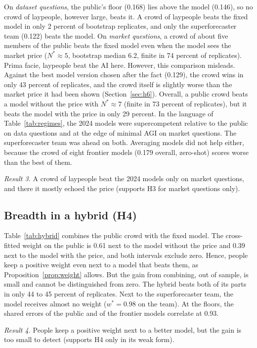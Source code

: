 \documentclass[11pt,a4paper]{article}
\theoremstyle{definition}
\begin{document}
On \emph{dataset questions}, the public's floor (0.168) lies above the model (0.146), so no crowd of laypeople, however large, beats it. A crowd of laypeople beats the fixed model in only 2 percent of bootstrap replicates, and only the superforecaster team (0.122) beats the model. On \emph{market questions}, a crowd of about five members of the public beats the fixed model even when the model sees the market price ($N^*\approx5$, bootstrap median 6.2, finite in 74 percent of replicates). Prima facie, laypeople beat the AI here. However, this comparison misleads. Against the best model version chosen after the fact (0.129), the crowd wins in only 43 percent of replicates, and the crowd itself is slightly worse than the market price it had been shown (Section~\ref{sec:h6}). Overall, a public crowd beats a model without the price with $N^*\approx7$ (finite in 73 percent of replicates), but it beats the model with the price in only 29 percent. In the language of Table~\ref{tab:regimes}, the 2024 models were supercompetent relative to the public on data questions and at the edge of minimal AGI on market questions. The superforecaster team was ahead on both. Averaging models did not help either, because the crowd of eight frontier models (0.179 overall, zero-shot) scores worse than the best of them.

\emph{Result 3.} A crowd of laypeople beat the 2024 models only on market questions, and there it mostly echoed the price (supports H3 for market questions only).

\subsection{Breadth in a hybrid (H4)}

Table~\ref{tab:hybrid} combines the public crowd with the fixed model. The cross-fitted weight on the public is 0.61 next to the model without the price and 0.39 next to the model with the price, and both intervals exclude zero. Hence, people keep a positive weight even next to a model that beats them, as Proposition~\ref{prop:weight} allows. But the gain from combining, out of sample, is small and cannot be distinguished from zero. The hybrid beats both of its parts in only 44 to 45 percent of replicates. Next to the superforecaster team, the model receives almost no weight ($w^*=0.98$ on the team). At the floors, the shared errors of the public and of the frontier models correlate at 0.93.

\emph{Result 4.} People keep a positive weight next to a better model, but the gain is too small to detect (supports H4 only in its weak form).
\end{document}
